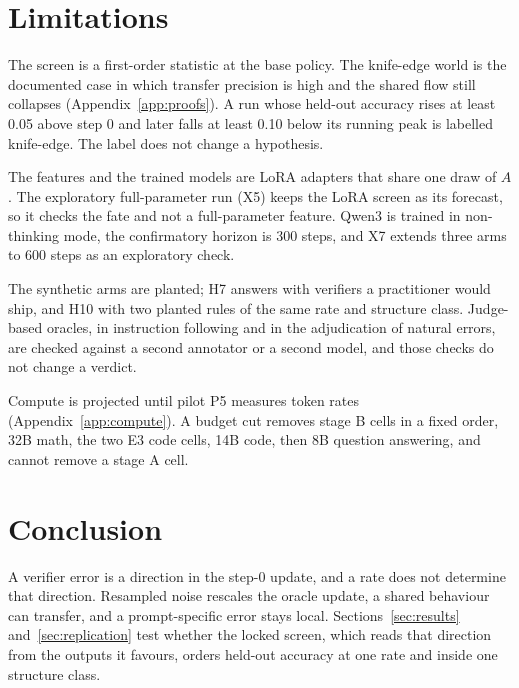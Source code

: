 \section{Limitations}
\label{sec:limits}

The screen is a first-order statistic at the base policy.
The knife-edge world is the documented case in which transfer precision is high and the shared flow still collapses (Appendix~\ref{app:proofs}).
A run whose held-out accuracy rises at least 0.05 above step 0 and later falls at least 0.10 below its running peak is labelled knife-edge.
The label does not change a hypothesis.

The features and the trained models are LoRA adapters that share one draw of $A$.
The exploratory full-parameter run (X5) keeps the LoRA screen as its forecast, so it checks the fate and not a full-parameter feature.
Qwen3 is trained in non-thinking mode, the confirmatory horizon is 300 steps, and X7 extends three arms to 600 steps as an exploratory check.

The synthetic arms are planted; H7 answers with verifiers a practitioner would ship, and H10 with two planted rules of the same rate and structure class.
Judge-based oracles, in instruction following and in the adjudication of natural errors, are checked against a second annotator or a second model, and those checks do not change a verdict.

Compute is projected until pilot P5 measures token rates (Appendix~\ref{app:compute}).
A budget cut removes stage B cells in a fixed order, 32B math, the two E3 code cells, 14B code, then 8B question answering, and cannot remove a stage A cell.

\section{Conclusion}
\label{sec:conclusion}

A verifier error is a direction in the step-0 update, and a rate does not determine that direction.
Resampled noise rescales the oracle update, a shared behaviour can transfer, and a prompt-specific error stays local.
Sections~\ref{sec:results} and~\ref{sec:replication} test whether the locked screen, which reads that direction from the outputs it favours, orders held-out accuracy at one rate and inside one structure class.

